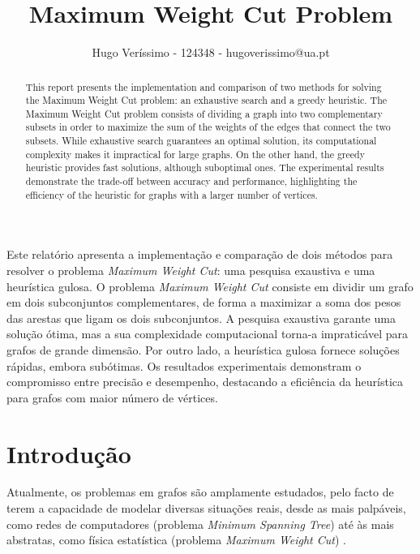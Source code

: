 \documentclass[mirror]{revdetua}
\begin{document}

\title{Maximum Weight Cut Problem}
\author{Hugo Veríssimo - 124348 - hugoverissimo@ua.pt}
\maketitle

\begin{abstract}
This report presents the implementation and comparison of two methods for solving the Maximum Weight Cut problem: an exhaustive search and a greedy heuristic. The Maximum Weight Cut problem consists of dividing a graph into two complementary subsets in order to maximize the sum of the weights of the edges that connect the two subsets. While exhaustive search guarantees an optimal solution, its computational complexity makes it impractical for large graphs. On the other hand, the greedy heuristic provides fast solutions, although suboptimal ones. The experimental results demonstrate the trade-off between accuracy and performance, highlighting the efficiency of the heuristic for graphs with a larger number of vertices.
\end{abstract}

\begin{resumo}
Este relatório apresenta a implementação e comparação de dois métodos para resolver o problema \textit{Maximum Weight Cut}: uma pesquisa exaustiva e uma heurística gulosa. O problema \textit{Maximum Weight Cut} consiste em dividir um grafo em dois subconjuntos complementares, de forma a maximizar a soma dos pesos das arestas que ligam os dois subconjuntos. A pesquisa exaustiva garante uma solução ótima, mas a sua complexidade computacional torna-a impraticável para grafos de grande dimensão. Por outro lado, a heurística gulosa fornece soluções rápidas, embora subótimas. Os resultados experimentais demonstram o compromisso entre precisão e desempenho, destacando a eficiência da heurística para grafos com maior número de vértices.
\end{resumo}

\section{Introdução}

Atualmente, os problemas em grafos são amplamente estudados, pelo facto de terem a capacidade de modelar diversas situações reais, desde as mais palpáveis, como redes de computadores (problema \textit{Minimum Spanning Tree}) até às mais abstratas, como física estatística (problema \textit{Maximum Weight Cut}) \cite{WANG10}.
\end{document}
